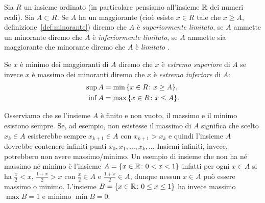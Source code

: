 \begin{definition}%
  Sia $R$ un insieme ordinato (in particolare pensiamo all'insieme ${\mathbb R}$ 
  dei numeri reali).
  \mymark{***}%
  Sia $A \subset R$.
  Se $A$ ha un maggiorante (cioè esiste $x\in R$ tale che $x\ge A$, definizione~\ref{def:minorante})
  diremo che $A$ è \emph{superiormente limitato},
  se $A$ ammette un minorante diremo che $A$ è \emph{inferiormente limitato},
  se $A$ ammette sia maggiorante che minorante diremo che $A$ è 
  \emph{limitato}%
%
.
  
  Se $x$ è minimo dei maggioranti di $A$ diremo che $x$ è
  \emph{estremo superiore}%
%
  di $A$ se invece $x$ è massimo dei minoranti diremo che $x$ è
  \emph{estremo inferiore}%
%
 di $A$:
  \begin{align*}
  \sup A &= \min {\left\{ x\in R \colon x\ge A \right\}}, \\
  \inf A &= \max {\left\{ x\in R \colon x \le A \right\}}.
  \end{align*}
  \index{$\sup$}%
  \index{$\inf$}%
\end{definition}

Osserviamo che se l'insieme $A$ è finito e non vuoto,
il massimo e il minimo esistono
sempre.
Se, ad esempio, non esistesse il massimo di $A$ significa che scelto
$x_k\in A$ esisterebbe sempre $x_{k+1}\in A$ con $x_{k+1} > x_k$ e quindi l'insieme
$A$ dovrebbe contenere infiniti punti $x_0,x_1, \dots, x_k,\dots $
Insiemi infiniti, invece, potrebbero non avere massimo/minimo.
Un esempio di insieme che non ha né massimo né minimo è
l'insieme $A = {\left\{ x\in {\mathbb R}\colon 0<x<1 \right\}}$ infatti per ogni
$x\in A$ si ha $\frac x 2<x$, $\frac{1+x}{2}>x$
con $\frac x 2\in A$ e $\frac{1+x}{2}\in A$,
dunque nessun $x\in A$ può essere
massimo o minimo. L'insieme $B={\left\{ x\in {\mathbb R} \colon 0\le x \le 1 \right\}}$
ha invece massimo $\max B= 1$ e minimo $\min B=0$.

